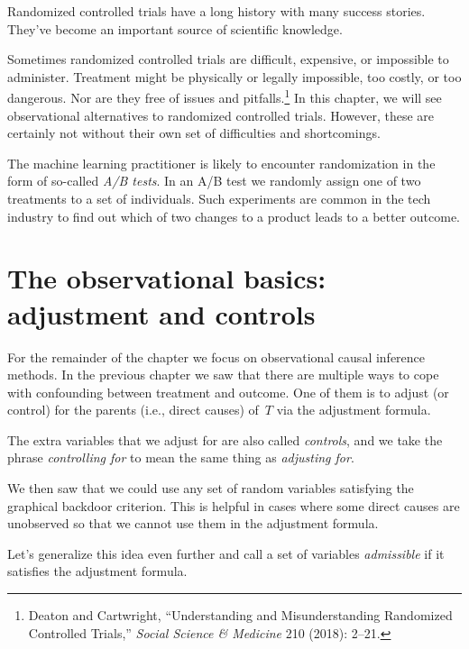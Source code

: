\documentclass{tufte-book}
\begin{document}
Randomized controlled trials have a long history with many success
stories. They've become an important source of scientific knowledge.

Sometimes randomized controlled trials are difficult, expensive, or
impossible to administer. Treatment might be physically or legally
impossible, too costly, or too dangerous. Nor are they free of issues
and pitfalls.\footnote{Deaton and Cartwright, {``Understanding and
  Misunderstanding Randomized Controlled Trials,''} \emph{Social Science
  \& Medicine} 210 (2018): 2--21.} In this chapter, we will see
observational alternatives to randomized controlled trials. However,
these are certainly not without their own set of difficulties and
shortcomings.

The machine learning practitioner is likely to encounter randomization
in the form of so-called \emph{A/B tests}. In an A/B test we randomly
assign one of two treatments to a set of individuals. Such experiments
are common in the tech industry to find out which of two changes to a
product leads to a better outcome.


\hypertarget{the-observational-basics-adjustment-and-controls}{%
\section{The observational basics: adjustment and
controls}\label{the-observational-basics-adjustment-and-controls}}

For the remainder of the chapter we focus on observational causal
inference methods. In the previous chapter we saw that there are
multiple ways to cope with confounding between treatment and outcome.
One of them is to adjust (or control) for the parents (i.e., direct
causes) of~\(T\) via the adjustment formula.

The extra variables that we adjust for are also called \emph{controls},
and we take the phrase \emph{controlling for} to mean the same thing as
\emph{adjusting for}.

We then saw that we could use any set of random variables satisfying the
graphical backdoor criterion. This is helpful in cases where some direct
causes are unobserved so that we cannot use them in the adjustment
formula.

Let's generalize this idea even further and call a set of variables
\emph{admissible} if it satisfies the adjustment
formula.
\end{document}
